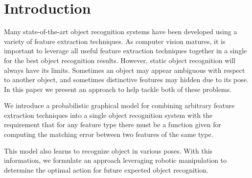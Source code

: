 \documentclass[conference]{IEEEtran}
\newcommand{\figref}[1]{Fig.~\ref{#1}}
\begin{document}
\IEEEpeerreviewmaketitle

\section{Introduction}


    Many state-of-the-art object recognition systems have been developed using a variety of feature extraction techniques. As computer vision matures, it is important to leverage all useful feature extraction techniques together in a single for the best object recognition results. However, static object recognition will always have its limits. Sometimes an object may appear ambiguous with respect to another object, and sometimes distinctive features may hidden due to its pose.  In this paper we present an approach to help tackle both of these problems.

    We introduce a probabilistic graphical model for combining arbitrary feature extraction techniques into a single object recognition system with the requirement that for any feature type there must be a function given for computing the matching error between two features of the same type. 

    This model also learns to recognize object in various poses. With this information, we formulate an approach leveraging robotic manipulation to determine the optimal action for future expected object recognition.  
    


\end{document}
